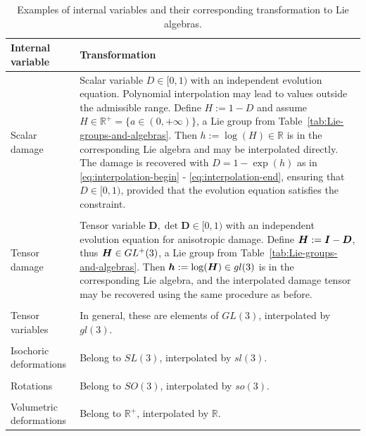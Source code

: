 \documentclass[12pt]{article}
\newcommand{\mbs}[1]{\boldsymbol{#1}}
\newcommand{\mbb}[1]{\mathbb{#1}}
\def\bD{{\mbs{D}}} \def\bE{{\mbs{E}}} \def\bF{{\mbs{F}}}
\begin{document}
\begin{table}[htbp]
  \begin{center}
    \begin{tabular}{ p{48mm} p{108mm} }
      \toprule
      Internal variable
      &
      Transformation
      \\
      \hline
      Scalar damage
      &
      Scalar variable $D \in [0,1)$ with an
      independent evolution equation.
      Polynomial interpolation may lead to
      values outside the admissible range. Define $H := 1 - D$ and assume
      $H \in \mbb{R}^+ = \{ a \in (0,+\infty) \}$, a Lie
      group from Table~\ref{tab:Lie-groups-and-algebras}. Then $h := \log(H)
      \in \mbb{R}$ is in the corresponding Lie algebra and may be
      interpolated directly. The damage
      is recovered with $D = 1 - \exp(h)$ as in
      \eqref{eq:interpolation-begin} - \eqref{eq:interpolation-end},
      ensuring that $D \in [0,1)$, provided that the
      evolution equation satisfies the constraint.
      \\
      \\
      Tensor damage
      &
      Tensor variable $\bD, \det\bD \in [0,1)$
      with an independent evolution equation for
      anisotropic damage. Define $\bH := \bI - \bD$, thus $\bH \in
      GL^+(3)$, a Lie group from
      Table~\ref{tab:Lie-groups-and-algebras}. Then $\bh := \log(\bH) \in
      gl(3)$ is in the corresponding Lie algebra, and the interpolated
      damage tensor may be recovered using the same procedure as before.
      \\
      \\
      Tensor variables
      &      
      In general, these are
      elements of $GL(3)$, interpolated by $gl(3)$.
      \\
      \\
      Isochoric deformations
      &
      Belong to $SL(3)$, interpolated by
      $sl(3)$.
      \\
      \\
      Rotations
      &
      Belong to $SO(3)$, interpolated by $so(3)$.
      \\
      \\
      Volumetric deformations
      &
      Belong to $\mbb{R}^+$, interpolated by
      $\mbb{R}$.
      \\
      \bottomrule
    \end{tabular}
    \caption{Examples of internal variables and their corresponding
      transformation to Lie algebras.}
    \label{tab:examples-IV}
  \end{center}
\end{table}
\end{document}
